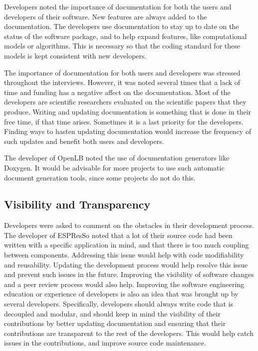 \documentclass[final, 3p, times, authoryear]{elsarticle}
\begin{document}
Developers noted the importance of documentation for both the users and
developers of their software. New features are always added to the
documentation. The developers use documentation to stay up to date on the status
of the software package, and to help expand features, like computational models
or algorithms. This is necessary so that the coding standard for these models is
kept consistent with new developers.

The importance of documentation for both users and developers was stressed
throughout the interviews. However, it was noted several times that a lack of
time and funding has a negative affect on the documentation. Most of the
developers are scientific researchers evaluated on the scientific papers that
they produce. Writing and updating documentation is something that is done in
their free time, if that time arises. Sometimes it is a last priority for the
developers. Finding ways to hasten updating documentation would increase the
frequency of such updates and benefit both users and developers. 

The developer of OpenLB noted the use of documentation generators like Doxygen.
It would be advisable for more projects to use such automatic document
generation tools, since some projects do not do this.  

\subsection{Visibility and Transparency}

Developers were asked to comment on the obstacles in their development process.
The developer of ESPResSo noted that a lot of their source code had been written
with a specific application in mind, and that there is too much coupling between
components. Addressing this issue would help with code modifiability and
reusability. Updating the development process would help resolve this issue and
prevent such issues in the future. Improving the visibility of software changes
and a peer review process would also help. Improving the software engineering
education or experience of developers is also an idea that was brought up by
several developers. Specifically, developers should always write code that is
decoupled and modular, and should keep in mind the visibility of their
contributions by better updating documentation and ensuring that their
contributions are transparent to the rest of the developers. This would help
catch issues in the contributions, and improve source code maintenance.   
\end{document}
